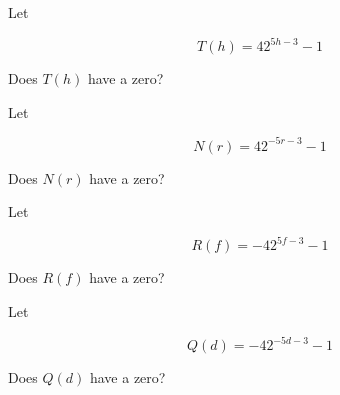 \documentclass{ximera}
\author{Lee Wayand}
\begin{document}
\begin{exercise}


\begin{question}



Let 

\[
T(h) = 4 2^{5h - 3} - 1
\]


Does $T(h)$ have a zero?


\begin{multipleChoice}
\end{multipleChoice}

\end{question}







\begin{question}



Let 

\[
N(r) = 4 2^{-5r - 3} - 1
\]


Does $N(r)$ have a zero?


\begin{multipleChoice}
\end{multipleChoice}

\end{question}





\begin{question}



Let 

\[
R(f) = -4 2^{5f - 3} - 1
\]


Does $R(f)$ have a zero?


\begin{multipleChoice}
\end{multipleChoice}

\end{question}








\begin{question}



Let 

\[
Q(d) = -4 2^{-5d - 3} - 1
\]


Does $Q(d)$ have a zero?


\begin{multipleChoice}
\end{multipleChoice}

\end{question}








\end{exercise}
\end{document}
